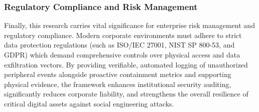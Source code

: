 \documentclass{ieeeaccess}
\begin{document}
\subsubsection{Regulatory Compliance and Risk Management}
Finally, this research carries vital significance for enterprise risk management and regulatory compliance. Modern corporate environments must adhere to strict data protection regulations (such as ISO/IEC 27001, NIST SP 800-53, and GDPR) which demand comprehensive controls over physical access and data exfiltration vectors. By providing verifiable, automated logging of unauthorized peripheral events alongside proactive containment metrics and supporting physical evidence, the framework enhances institutional security auditing, significantly reduces corporate liability, and strengthens the overall resilience of critical digital assets against social engineering attacks.
\end{document}
